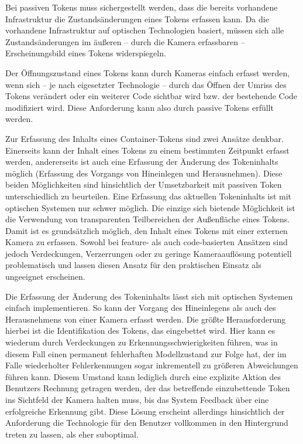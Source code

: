 Bei passiven Tokens muss sichergestellt werden, dass die bereits vorhandene Infrastruktur die Zustandsänderungen eines Tokens erfassen kann. Da die vorhandene Infrastruktur auf optischen Technologien basiert, müssen sich alle Zustandsänderungen im äußeren -- durch die Kamera erfassbaren -- Erscheinungsbild eines Tokens widerspiegeln.

Der Öffnungszustand eines Tokens kann durch Kameras einfach erfasst werden, wenn sich -- je nach eigesetzter Technologie -- durch das Öffnen der Umriss des Tokens verändert oder ein weiterer Code sichtbar wird bzw. der bestehende Code modifiziert wird. Diese Anforderung kann also durch passive Tokens erfüllt werden.

Zur Erfassung des Inhalts eines Container-Tokens sind zwei Ansätze denkbar. Einerseits kann der Inhalt eines Tokens zu einem bestimmten Zeitpunkt erfasst werden, andererseits ist auch eine Erfassung der Änderung des Tokeninhalts möglich (Erfassung des Vorgangs von Hineinlegen und Herausnehmen). Diese beiden Möglichkeiten sind hinsichtlich der Umsetzbarkeit mit passiven Token unterschiedlich zu beurteilen. Eine Erfassung das aktuellen Tokeninhalts ist mit optischen Systemen nur schwer möglich. Die einzige sich bietende Möglichkeit ist die Verwendung von transparenten Teilbereichen der Außenfläche eines Tokens. Damit ist es grundsätzlich möglich, den Inhalt eines Tokens mit einer externen Kamera zu erfassen. Sowohl bei feature- als auch code-basierten Ansätzen sind jedoch Verdeckungen, Verzerrungen oder zu geringe Kameraauflösung potentiell problematisch und lassen diesen Ansatz für den praktischen Einsatz als ungeeignet erscheinen.

Die Erfassung der Änderung des Tokeninhalts lässt sich mit optischen Systemen einfach implementieren. So kann der Vorgang des Hineinlegens als auch des Herausnehmens von einer Kamera erfasst werden. Die größte Herausforderung hierbei ist die Identifikation des Tokens, das eingebettet wird. Hier kann es wiederum durch Verdeckungen zu Erkennungsschwierigkeiten führen, was in diesem Fall einen permanent fehlerhaften Modellzustand zur Folge hat, der im Falle wiederholter Fehlerkennungen sogar inkrementell zu größeren Abweichungen führen kann. Diesem Umstand kann lediglich durch eine explizite Aktion des Benutzers Rechnung getragen werden, der das betreffende einzubettende Token ins Sichtfeld der Kamera halten muss, bis das System Feedback über eine erfolgreiche Erkennung gibt. Diese Lösung erscheint allerdings hinsichtlich der Anforderung die Technologie für den Benutzer vollkommen in den Hintergrund treten zu lassen, als eher suboptimal.

